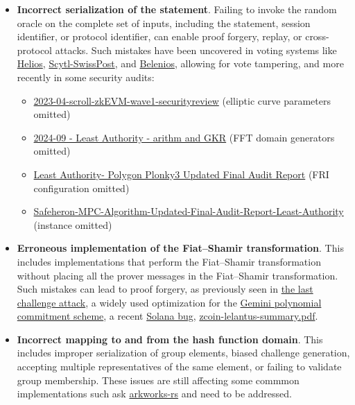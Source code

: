 \documentclass{article}
\begin{document}
\begin{itemize}
    \item \textbf{Incorrect serialization of the statement}. Failing to invoke the random oracle on the complete set of inputs, including the statement, session identifier, or protocol identifier, can enable proof forgery, replay, or cross-protocol attacks. Such mistakes have been uncovered in voting systems like \href{https://eprint.iacr.org/2016/771}{Helios}, \href{https://ieeexplore.ieee.org/document/9152765}{Scytl-SwissPost}, and \href{https://inria.hal.science/hal-02928953/file/final.pdf}{Belenios}, allowing for vote tampering, and more recently in some security audits:
    \begin{itemize}
    \item
\href{https://github.com/trailofbits/publications/blob/master/reviews/2023-04-scroll-zkEVM-wave1-securityreview.pdf}{\textsf{2023-04-scroll-zkEVM-wave1-securityreview}} (elliptic curve parameters omitted)
\item \href{https://github.com/Consensys/gnark/blob/master/audits/2024-09\%20-\%20Least\%20Authority\%20-\%20arithm\%20and\%20GKR.pdf}{\textsf{2024-09 - Least Authority - arithm and GKR}} (FFT domain generators omitted)
\item \href{https://leastauthority.com/wp-content/uploads/2024/11/Updated\_071124\_Polygon\_Plonky3\_Final\_Audit\_Report.pdf}{\textsf{Least Authority- Polygon Plonky3 Updated Final Audit Report}} (FRI configuration omitted)
\item \href{https://leastauthority.com/wp-content/uploads/2023/10/Safeheron_MPC_Algorithm_Updated_Final_Audit_Report_Least_Authority.pdf}{\textsf{Safeheron-MPC-Algorithm-Updated-Final-Audit-Report-Least-Authority}} (instance omitted)
    \end{itemize}
    \item \textbf{Erroneous implementation of the Fiat--Shamir transformation}. This includes implementations that perform the Fiat--Shamir transformation without placing all the prover messages in the Fiat--Shamir transformation. Such mistakes can lead to proof forgery, as previously seen in \href{https://www.youtube.com/watch?v=Sk-S8-n6Jo4}{the last challenge attack}, a widely used optimization for the \href{https://eprint.iacr.org/2025/565}{Gemini polynomial commitment scheme}, a recent \href{https://t.co/RFaHQOtAAq}{Solana bug},
    \href{https://github.com/trailofbits/publications/blob/master/reviews/zcoin-lelantus-summary}{zcoin-lelantus-summary.pdf}.

    \item \textbf{Incorrect mapping to and from the hash function domain}. This includes improper serialization of group elements, biased challenge generation, accepting multiple representatives of the same element, or failing to validate group membership. These issues are still affecting some commmon implementations such ask \href{https://github.com/arkworks-rs/crypto-primitives/blob/main/crypto-primitives/src/snark/constraints.rs#L163}{arkworks-rs} and need to be addressed.


\end{itemize}
\end{document}
